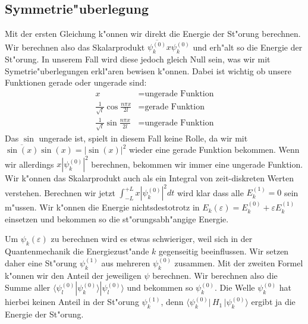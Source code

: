 \begin{refsection}
\subsection{Symmetrie"uberlegung}
Mit der ersten Gleichung k"onnen wir direkt die Energie der St"orung berechnen.
Wir berechnen also das Skalarprodukt $\overline{\psi_k^{(0)}} x \psi_k^{(0)}$
und erh"alt so die Energie der St"orung.
In unserem Fall wird diese jedoch gleich Null sein,
was wir mit Symetrie"uberlegungen erkl"aren bewisen k"onnen.
Dabei ist wichtig ob unsere Funktionen gerade oder ungerade sind:
\begin{equation}
\begin{aligned}
x &= \text{ungerade Funktion}
\\
\frac{1}{\sqrt{l}}\cos\frac{n \pi x}{2l} &= \text{gerade Funktion}
\\
\frac{1}{\sqrt{l}}\sin\frac{n \pi x}{2l} &= \text{ungerade Funktion}
\end{aligned}
\end{equation}
Das $\sin$ ungerade ist, spielt in diesem Fall keine Rolle,
da wir mit $\overline{\sin(x)} \sin(x) = |\sin(x)|^2$ wieder eine gerade Funktion bekommen.
Wenn wir allerdings $x |\psi_k^{(0)}|^2$ berechnen, bekommen wir immer eine ungerade Funktion.
Wir k"onnen das Skalarprodukt auch als ein Integral von zeit-diskreten Werten verstehen.
Berechnen wir jetzt $\int_{-L}^{+L} x |\psi_k^{(0)}|^2 dt$ wird klar
dass alle $E_k^{(1)} = 0$ sein m"ussen.
Wir k"onnen die Energie nichtsdestotrotz in
$E_k(\varepsilon)=E_k^{(0)} + \varepsilon E_k^{(1)}$ einsetzen
und bekommen so die st"orungsabh"angige Energie.

Um $\psi_k(\varepsilon)$ zu berechnen wird es etwas schwieriger,
weil sich in der Quantenmechanik die Energiezust"ande $k$ gegenseitig beeinflussen.
Wir setzen daher eine St"orung $\psi_k^{(1)}$ aus mehreren $\psi_k^{(0)}$ zusammen.
Mit der zweiten Formel k"onnen wir den Anteil der jeweiligen $\psi$ berechnen.
Wir berechnen also die Summe aller $\langle\psi_l^{(0)}|\psi_k^{(0)}\rangle|\psi_l^{(0)}\rangle$
und bekommen so $\psi_k^{(0)}$.
Die Welle $\psi_k^{(0)}$ hat hierbei keinen Anteil in der St"orung $\psi_k^{(1)}$,
denn $\langle \psi_k^{(0)}|\, H_1 \,|\psi_k^{(0)}\rangle$ ergibt ja die Energie der St"orung.


\end{refsection}
